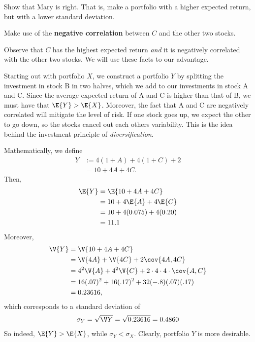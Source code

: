 \begin{exercise}
Show that Mary is right. That is, make a portfolio with a higher expected return, but with a lower standard deviation. \\
\begin{hint}
Make use of the \textbf{negative correlation} between $C$ and the other two stocks.
\end{hint}
\begin{solution}
Observe that $C$ has the highest expected return \textit{and} it is negatively correlated with the other two stocks. We will use these facts to our advantage.

Starting out with portfolio $X$, we construct a portfolio $Y$ by splitting the investment in stock B in two halves, which we add to our investments in stock A and C. Since the average expected return of A and C is higher than that of B, we must have that $\E{Y} > \E{X}$. Moreover, the fact that A and C are negatively correlated will mitigate the level of risk. If one stock goes up, we expect the other to go down, so the stocks cancel out each others variability. This is the idea behind the investment principle of \textit{diversification}.

Mathematically, we define
\begin{align}
    Y &:= 4(1 + A) + 4(1 + C) + 2 \\
    &= 10 + 4A + 4C.
\end{align}
Then,
\begin{align}
    \E{Y} &= \E{10 + 4A + 4C} \\
    &= 10 + 4\E{A} + 4\E{C} \\
    &= 10 + 4(0.075) + 4(0.20) \\
    &= 11.1
\end{align}
Moreover,
\begin{align}
    \V{Y} &= \V{10 + 4A + 4C} \\
    &= \V{4A} + \V{4C} + 2 \cov{4A, 4C}\\
    &= 4^2\V{A} + 4^2 \V{C} +2 \cdot  4 \cdot 4 \cdot \cov{A,C} \\
    &= 16 (.07)^2 + 16 (.17)^2  + 32 (-.8)(.07)(.17) \\
    &= 0.23616,
\end{align}
which corresponds to a standard deviation of
\begin{align}
    \sigma_Y = \sqrt{\V Y} = \sqrt{0.23616} = 0.4860
\end{align}
So indeed, $\E{Y} > \E{X}$, while $\sigma_Y < \sigma_X$. Clearly, portfolio $Y$ is more desirable.
\end{solution}
\end{exercise}


